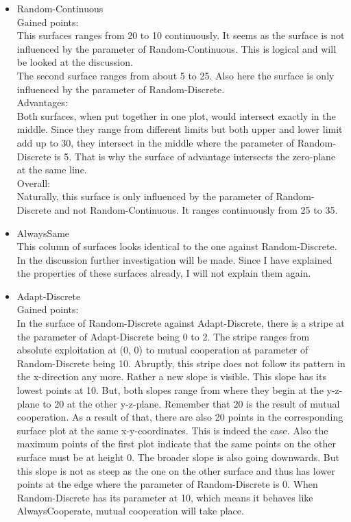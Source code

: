 \documentclass{article}
\begin{document}
\begin{itemize}
	\item Random-Continuous\\

		Gained points:\\
			This surfaces ranges from 20 to 10 continuously.
			It seems as the surface is not influenced by the parameter of Random-Continuous.
			This is logical and will be looked at the discussion.\\
			The second surface ranges from about 5 to 25.
			Also here the surface is only influenced by the parameter of Random-Discrete.
		\\Advantages:\\
			Both surfaces, when put together in one plot, would intersect exactly in the middle.
			Since they range from different limits but both upper and lower limit add up to 30, they intersect in the middle where the parameter of Random-Discrete is 5.
			That is why the surface of advantage intersects the zero-plane at the same line.
		\\Overall:\\
			Naturally, this surface is only influenced by the parameter of Random-Discrete and not Random-Continuous.
			It ranges continuously from 25 to 35.

	\item AlwaysSame\\
		This column of surfaces looks identical to the one against Random-Discrete.
		In the discussion further investigation will be made.
		Since I have explained the properties of these surfaces already, I will not explain them again.

	\item Adapt-Discrete\\

		Gained points:\\
			In the surface of Random-Discrete against Adapt-Discrete, there is a stripe at the parameter of Adapt-Discrete being 0 to 2.
			The stripe ranges from absolute exploitation at (0, 0) to mutual cooperation at parameter of Random-Discrete being 10.
			Abruptly, this stripe does not follow its pattern in the x-direction any more.
			Rather a new slope is visible.
			This slope has its lowest points at 10.
			But, both slopes range from where they begin at the y-z-plane to 20 at the other y-z-plane.
			Remember that 20 is the result of mutual cooperation.
			As a result of that, there are also 20 points in the corresponding surface plot at the same x-y-coordinates.
			This is indeed the case.
			Also the maximum points of the first plot indicate that the same points on the other surface must be at height 0.
			The broader slope is also going downwards.
			But this slope is not as steep as the one on the other surface and thus has lower points at the edge where the parameter of Random-Discrete is 0.
			When Random-Discrete has its parameter at 10, which means it behaves like AlwaysCooperate, mutual cooperation will take place.\\


\end{itemize}
\end{document}
